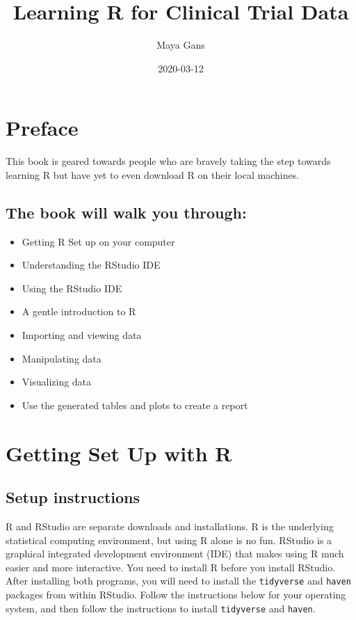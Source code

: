 \documentclass[]{book}
\title{Learning R for Clinical Trial Data}
\author{Maya Gans}
\date{2020-03-12}
\providecommand{\tightlist}{%
  \setlength{\itemsep}{0pt}\setlength{\parskip}{0pt}}
\begin{document}
\maketitle

{
\setcounter{tocdepth}{1}
\tableofcontents
}
\hypertarget{preface}{%
\chapter{Preface}\label{preface}}

This book is geared towards people who are bravely taking the step towards learning R but have yet to even download R on their local machines.

\hypertarget{the-book-will-walk-you-through}{%
\section{The book will walk you through:}\label{the-book-will-walk-you-through}}

\begin{itemize}
\tightlist
\item
  Getting R Set up on your computer
\item
  Understanding the RStudio IDE
\item
  Using the RStudio IDE
\item
  A gentle introduction to R
\item
  Importing and viewing data
\item
  Manipulating data
\item
  Visualizing data
\item
  Use the generated tables and plots to create a report
\end{itemize}

\hypertarget{getting-set-up-with-r}{%
\chapter{Getting Set Up with R}\label{getting-set-up-with-r}}

\hypertarget{setup-instructions}{%
\section{Setup instructions}\label{setup-instructions}}

R and RStudio are separate downloads and installations. R is the underlying statistical computing environment, but using R alone is no fun. RStudio is a graphical integrated development environment (IDE) that makes using R much easier and more interactive. You need to install R before you install RStudio. After installing both programs, you will need to install the \texttt{tidyverse} and \texttt{haven} packages from within RStudio. Follow the instructions below for your operating system, and then follow the instructions to install \texttt{tidyverse} and \texttt{haven}.
\end{document}
